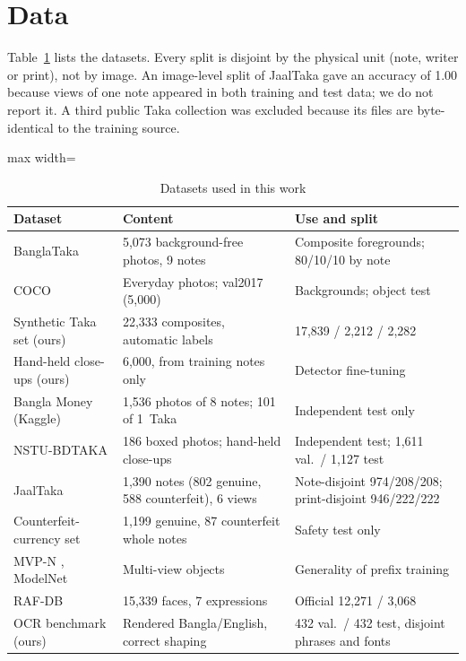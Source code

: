 \documentclass[preprint,12pt]{elsarticle}
\begin{document}
\section{Data}
\label{sec:data}
Table~\ref{tab:data} lists the datasets. Every split is disjoint by the physical unit (note, writer or print), not by image. An image-level split of JaalTaka gave an accuracy of 1.00 because views of one note appeared in both training and test data; we do not report it. A third public Taka collection was excluded because its files are byte-identical to the training source.

\begin{table}[!htbp]
\caption{Datasets used in this work}
\label{tab:data}
\centering\footnotesize
\begin{adjustbox}{max width=\textwidth}\begin{tabular}{@{}p{3.3cm}p{5.4cm}p{4.9cm}@{}}
\toprule
Dataset & Content & Use and split \\ \midrule
BanglaTaka \cite{banglataka} & 5,073 background-free photos, 9 notes & Composite foregrounds; 80/10/10 by note \\
COCO \cite{coco} & Everyday photos; val2017 (5,000) & Backgrounds; object test \\
Synthetic Taka set (ours) & 22,333 composites, automatic labels & 17,839 / 2,212 / 2,282 \\
Hand-held close-ups (ours) & 6,000, from training notes only & Detector fine-tuning \\
Bangla Money (Kaggle) & 1,536 photos of 8 notes; 101 of 1~Taka & Independent test only \\
NSTU-BDTAKA \cite{nstubdtaka2024} & 186 boxed photos; hand-held close-ups & Independent test; 1,611 val.\ / 1,127 test \\
JaalTaka \cite{jaaltaka} & 1,390 notes (802 genuine, 588 counterfeit), 6 views & Note-disjoint 974/208/208; print-disjoint 946/222/222 \\
Counterfeit-currency set & 1,199 genuine, 87 counterfeit whole notes & Safety test only \\
MVP-N \cite{mvpn}, ModelNet \cite{modelnet} & Multi-view objects & Generality of prefix training \\
RAF-DB \cite{rafdb} & 15,339 faces, 7 expressions & Official 12,271 / 3,068 \\
OCR benchmark (ours) & Rendered Bangla/English, correct shaping \cite{harfbuzz} & 432 val.\ / 432 test, disjoint phrases and fonts \\

\end{tabular}
\end{adjustbox}
\end{table}
\end{document}
